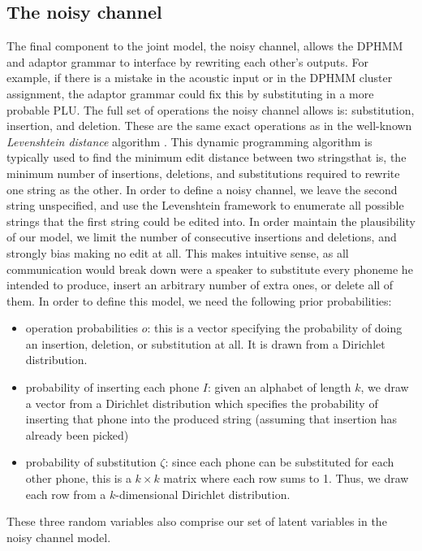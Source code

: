 \documentclass[12pt,letterpaper]{article}
\begin{document}
\subsection{The noisy channel}
The final component to the joint model, the noisy channel, allows the DPHMM and adaptor grammar to interface by rewriting each other's outputs. For example, if there is a mistake in the acoustic input or in the DPHMM cluster assignment, the adaptor grammar could fix this by substituting in a more probable PLU. The full set of operations the noisy channel allows is: substitution, insertion, and deletion. These are the same exact operations as in the well-known \textit{Levenshtein distance} algorithm \citep{levenshtein:1966}. This dynamic programming algorithm is typically used to find the minimum edit distance between two strings\textemdash that is, the minimum number of insertions, deletions, and substitutions required to rewrite one string as the other. In order to define a noisy channel, we leave the second string unspecified, and use the Levenshtein framework to enumerate all possible strings that the first string could be edited into. In order maintain the plausibility of our model, we limit the number of consecutive insertions and deletions, and strongly bias making no edit at all. This makes intuitive sense, as all communication would break down were a speaker to substitute every phoneme he intended to produce, insert an arbitrary number of extra ones, or delete all of them. In order to define this model, we need the following prior probabilities: 
\begin{itemize}
    \item operation probabilities $o$: this is a vector specifying the probability of doing an insertion, deletion, or substitution at all. It is drawn from a Dirichlet distribution.
    \item probability of inserting each phone $I$: given an alphabet of length $k$, we draw a vector from a Dirichlet distribution which specifies the probability of inserting that phone into the produced string (assuming that insertion has already been picked)
    \item probability of substitution $\zeta$: since each phone can be substituted for each other phone, this is a $k\times k$ matrix where each row sums to 1. Thus, we draw each row from a $k$-dimensional Dirichlet distribution. 
\end{itemize}
\noindent These three random variables also comprise our set of latent variables in the noisy channel model. 
\end{document}
